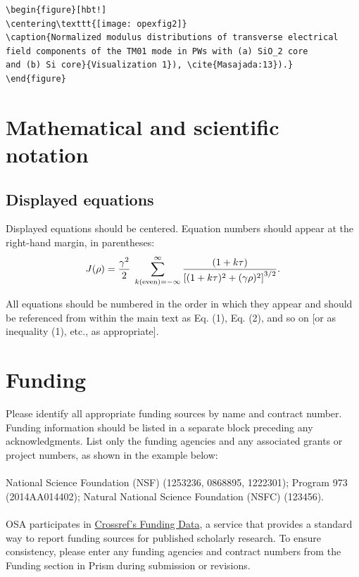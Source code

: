 \documentclass{osa-article}
\begin{document}
\begin{verbatim}
\begin{figure}[hbt!]
\centering\texttt{[image: opexfig2]}
\caption{Normalized modulus distributions of transverse electrical
field components of the TM01 mode in PWs with (a) SiO_2 core
and (b) Si core}{Visualization 1}), \cite{Masajada:13}).}
\end{figure}
\end{verbatim}

\section{Mathematical and scientific notation}

\subsection{Displayed equations} Displayed equations should be centered.
Equation numbers should appear at the right-hand margin, in
parentheses:
\begin{equation}
J(\rho) =
 \frac{\gamma^2}{2} \; \sum_{k({\rm even}) = -\infty}^{\infty}
	\frac{(1 + k \tau)}{ \left[ (1 + k \tau)^2 + (\gamma  \rho)^2  \right]^{3/2} }.
\end{equation}

All equations should be numbered in the order in which they appear
and should be referenced  from within the main text as Eq. (1),
Eq. (2), and so on [or as inequality (1), etc., as appropriate].


\section*{Funding}
Please identify all appropriate funding sources by name and contract number. Funding information should be listed in a separate block preceding any acknowledgments. List only the funding agencies and any associated grants or project numbers, as shown in the example below:\\
\\
National Science Foundation (NSF) (1253236, 0868895, 1222301); Program 973 (2014AA014402); Natural National Science Foundation (NSFC) (123456).\\
\\
OSA participates in \href{https://www.crossref.org/fundingdata/}{Crossref's Funding Data}, a service that provides a standard way to report funding sources for published scholarly research. To ensure consistency, please enter any funding agencies and contract numbers from the Funding section in Prism during submission or revisions.
\end{document}

